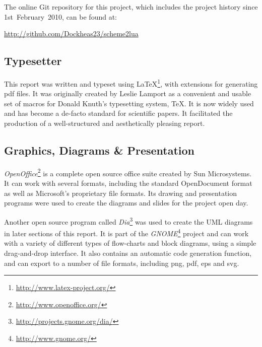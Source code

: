 The online Git repository for this project, which includes the project history
since 1st~February~2010, can be found at:
\begin{center}\url{http://github.com/Dockheas23/scheme2lua}\end{center}

\subsection{Typesetter}

This report was written and typeset using
\LaTeX\footnote{\url{http://www.latex-project.org/}}, with extensions for
generating pdf files. It was originally created by Leslie Lamport as a
convenient and usable set of macros for Donald Knuth's typesetting system, \TeX.
It is now widely used and has become a de-facto standard for scientific papers.
It facilitated the production of a well-structured and aesthetically pleasing
report.

\subsection{Graphics, Diagrams \& Presentation}

\emph{OpenOffice}\footnote{\url{http://www.openoffice.org/}} is a complete open
source office suite created by Sun Microsystems.  It can work with several
formats, including the standard OpenDocument format as well as Microsoft's
proprietary file formats. Its drawing and presentation programs were used to
create the diagrams and slides for the project open day.

Another open source program called
\emph{Dia}\footnote{\url{http://projects.gnome.org/dia/}} was used to create the
UML diagrams in later sections of this report. It is part of the
\emph{GNOME}\footnote{\url{http://www.gnome.org/}} project and can work with a
variety of different types of flow-charts and block diagrams, using a simple
drag-and-drop interface. It also contains an automatic code generation function,
and can export to a number of file formats, including png, pdf, eps and svg.

